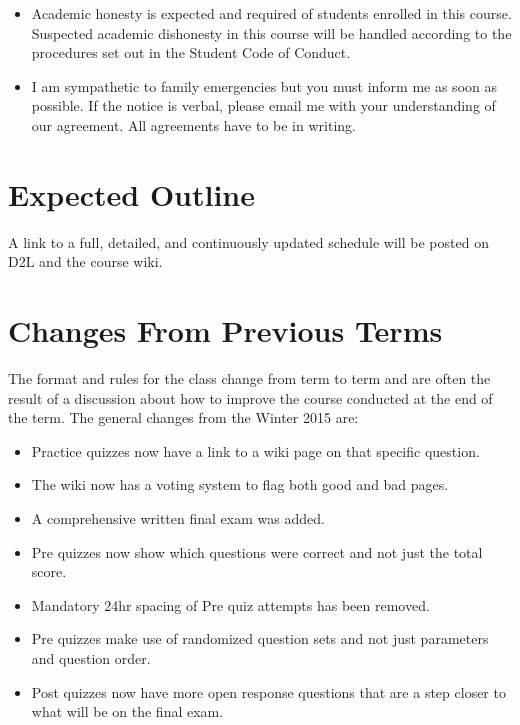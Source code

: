 \documentclass[letterpaper,10pt]{article}
\begin{document}
\begin{itemize}
\item Academic honesty is expected and required of students enrolled
  in this course.  Suspected academic dishonesty in this course will
  be handled according to the procedures set out in the Student Code
  of Conduct.

\item I am sympathetic to family emergencies but you must inform me as
  soon as possible. If the notice is verbal, please email me with your
  understanding of our agreement. All agreements have to be in
  writing.


\end{itemize}


\section{Expected Outline}
A link to a full, detailed, and continuously updated schedule will be
posted on D2L and the course wiki.


\section{Changes From Previous Terms}
The format and rules for the class change from term to term and are often the result of a discussion about how to improve the course conducted at the end of the term. The general changes from the Winter 2015 are:

\begin{itemize}
    \item Practice quizzes now have a link to a wiki page on that specific question.
    \item The wiki now has a voting system to flag both good and bad pages.
    \item A comprehensive written final exam was added.
    \item Pre quizzes now show which questions were correct and not just the total score.
    \item Mandatory 24hr spacing of Pre quiz attempts has been removed.
    \item Pre quizzes make use of randomized question sets and not just parameters and question order.
    \item Post quizzes now have more open response questions that are a step closer to what will be on the final exam.
\end{itemize}
\end{document}
